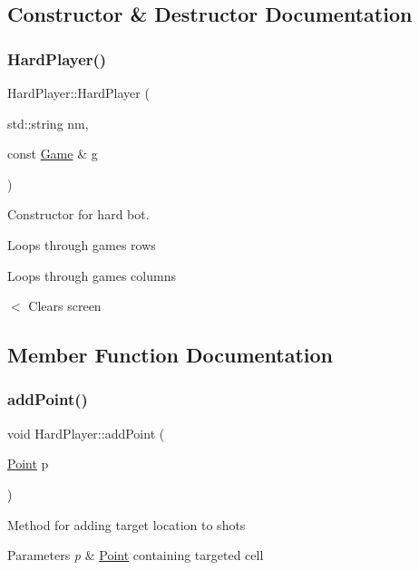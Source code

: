 \subsection{Constructor \& Destructor Documentation}
\mbox{\label{class_hard_player_a40d564084e88021b21324672bf67b169}} 
\subsubsection{\texorpdfstring{Hard\+Player()}{HardPlayer()}}
{\footnotesize\ttfamily Hard\+Player\+::\+Hard\+Player (\begin{DoxyParamCaption}\item[{std\+::string}]{nm,  }\item[{const \mbox{\hyperlink{class_game}{Game}} \&}]{g }\end{DoxyParamCaption})\hspace{0.3cm}{\ttfamily [inline]}}



Constructor for hard bot. 

Loops through game\textquotesingle{}s rows

Loops through games columns

$<$ Clears screen 

\subsection{Member Function Documentation}
\mbox{\label{class_hard_player_a77c82c1a36c9e956fdab98837ed888e5}} 
\subsubsection{\texorpdfstring{add\+Point()}{addPoint()}}
{\footnotesize\ttfamily void Hard\+Player\+::add\+Point (\begin{DoxyParamCaption}\item[{\mbox{\hyperlink{class_point}{Point}}}]{p }\end{DoxyParamCaption})\hspace{0.3cm}{\ttfamily [virtual]}}

Method for adding target location to shots 
\begin{DoxyParams}{Parameters}
{\em p} & \mbox{\hyperlink{class_point}{Point}} containing targeted cell \\
\hline
\end{DoxyParams}
\mbox{\label{class_hard_player_a8107a94c8db7d5f1023dbeeddfaaedb2}} 
